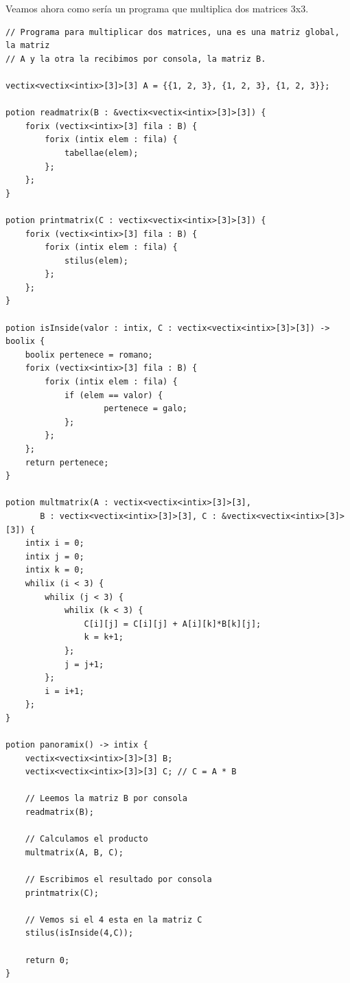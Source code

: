 \documentclass[a4paper, 10pt]{article}
\begin{document}
    Veamos ahora como sería un programa que multiplica dos matrices 3x3.
    \begin{verbatim}
// Programa para multiplicar dos matrices, una es una matriz global, la matriz
// A y la otra la recibimos por consola, la matriz B.

vectix<vectix<intix>[3]>[3] A = {{1, 2, 3}, {1, 2, 3}, {1, 2, 3}};

potion readmatrix(B : &vectix<vectix<intix>[3]>[3]) {
    forix (vectix<intix>[3] fila : B) {
        forix (intix elem : fila) {
            tabellae(elem);
        };
    };
}

potion printmatrix(C : vectix<vectix<intix>[3]>[3]) {
    forix (vectix<intix>[3] fila : B) {
        forix (intix elem : fila) {
            stilus(elem);
        };
    };
}

potion isInside(valor : intix, C : vectix<vectix<intix>[3]>[3]) -> boolix {
    boolix pertenece = romano; 
    forix (vectix<intix>[3] fila : B) {
        forix (intix elem : fila) {
            if (elem == valor) {
                    pertenece = galo;
            };
        };
    };
    return pertenece;
}

potion multmatrix(A : vectix<vectix<intix>[3]>[3], 
       B : vectix<vectix<intix>[3]>[3], C : &vectix<vectix<intix>[3]>[3]) {
    intix i = 0;
    intix j = 0;
    intix k = 0;
    whilix (i < 3) {
        whilix (j < 3) {
            whilix (k < 3) {
                C[i][j] = C[i][j] + A[i][k]*B[k][j];
                k = k+1;
            };
            j = j+1;
        };
        i = i+1;
    };
}

potion panoramix() -> intix {
    vectix<vectix<intix>[3]>[3] B;
    vectix<vectix<intix>[3]>[3] C; // C = A * B
    
    // Leemos la matriz B por consola
    readmatrix(B);
    
    // Calculamos el producto
    multmatrix(A, B, C);

    // Escribimos el resultado por consola
    printmatrix(C);

    // Vemos si el 4 esta en la matriz C
    stilus(isInside(4,C));
    
    return 0;
}
    \end{verbatim}
\end{document}
